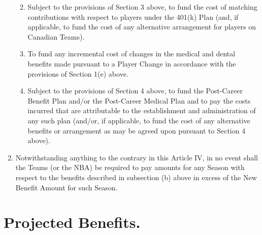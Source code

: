 \documentclass[
]{book}
\providecommand{\tightlist}{%
  \setlength{\itemsep}{0pt}\setlength{\parskip}{0pt}}
\begin{document}
\begin{enumerate}
  \begin{enumerate}
  \def\labelenumii{(\arabic{enumii})}
  \tightlist
  \item
    Subject to the provisions of Section 3 above, to fund the cost of matching contributions with respect to players under the 401(k) Plan (and, if applicable, to fund the cost of any alternative arrangement for players on Canadian Teams).
  \item
    To fund any incremental cost of changes in the medical and dental benefits made pursuant to a Player Change in accordance with the provisions of Section 1(e) above.
  \item
    Subject to the provisions of Section 4 above, to fund the Post-Career Benefit Plan and/or the Post-Career Medical Plan and to pay the costs incurred that are attributable to the establishment and administration of any such plan (and/or, if applicable, to fund the cost of any alternative benefits or arrangement as may be agreed upon pursuant to Section 4 above).
  \end{enumerate}
\item
  Notwithstanding anything to the contrary in this Article IV, in no event shall the Teams (or the NBA) be required to pay amounts for any Season with respect to the benefits described in subsection (b) above in excess of the New Benefit Amount for such Season.
\end{enumerate}

\hypertarget{projected-benefits.}{%
\section{Projected Benefits.}\label{projected-benefits.}}
\end{document}
